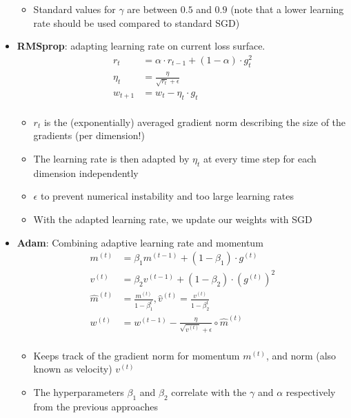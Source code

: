 \begin{itemize}
\begin{itemize}
		\item Standard values for $\gamma$ are between $0.5$ and $0.9$ (note that a lower learning rate should be used compared to standard SGD)
	\end{itemize}
	\item \textbf{RMSprop}: adapting learning rate on current loss surface.
	\begin{equation*}
		\begin{split}
			r_t & = \alpha \cdot r_{t-1} + \left(1 - \alpha\right) \cdot g_t^2\\
			\eta_t & = \frac{\eta}{\sqrt{r_t} + \epsilon} \\
			w_{t+1} & = w_{t} - \eta_t \cdot g_t\\
		\end{split}
	\end{equation*}
	\begin{itemize}
		\item $r_t$ is the (exponentially) averaged gradient norm describing the size of the gradients (per dimension!)
		\item The learning rate is then adapted by $\eta_t$ at every time step for each dimension independently
		\item $\epsilon$ to prevent numerical instability and too large learning rates
		\item With the adapted learning rate, we update our weights with SGD
	\end{itemize}
	\item \textbf{Adam}: Combining adaptive learning rate and momentum
	\begin{equation*}
		\begin{split}
			m^{(t)} & = \beta_1 m^{(t-1)} + (1 - \beta_1)\cdot g^{(t)}\\
			v^{(t)} & = \beta_2 v^{(t-1)} + (1 - \beta_2)\cdot \left(g^{(t)}\right)^2\\
			\hat{m}^{(t)} & = \frac{m^{(t)}}{1-\beta^{t}_1}, \hat{v}^{(t)} = \frac{v^{(t)}}{1-\beta^{t}_2}\\
			w^{(t)} & = w^{(t-1)} - \frac{\eta}{\sqrt{v^{(t)}} + \epsilon}\circ \hat{m}^{(t)}\\
		\end{split}
	\end{equation*}
	\begin{itemize}
		\item Keeps track of the gradient norm for momentum $m^{(t)}$, and norm (also known as velocity) $v^{(t)}$
		\item The hyperparameters $\beta_1$ and $\beta_2$ correlate with the $\gamma$ and $\alpha$ respectively from the previous approaches

\end{itemize}
\end{itemize}
